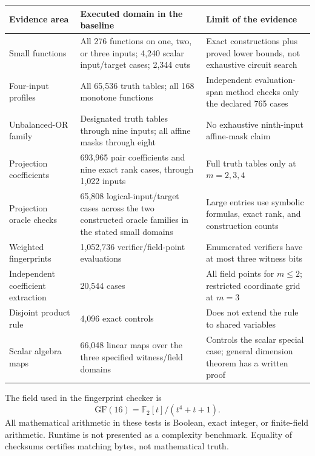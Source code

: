 \documentclass[11pt,letterpaper,oneside]{report}
\theoremstyle{komorebi}
\newcommand{\F}{\mathbb F_2}
\begin{document}
\small
\begin{longtable}{@{}p{1.57in}p{2.27in}p{2.00in}@{}}
\toprule
\textbf{Evidence area} & \textbf{Executed domain in the baseline} & \textbf{Limit of the evidence}\\\midrule\endhead
Small functions & All 276 functions on one, two, or three inputs; 4,240 scalar input/target cases; 2,344 cuts & Exact constructions plus proved lower bounds, not exhaustive circuit search\\
Four-input profiles & All 65,536 truth tables; all 168 monotone functions & Independent evaluation-span method checks only the declared 765 cases\\
Unbalanced-OR family & Designated truth tables through nine inputs; all affine masks through eight & No exhaustive ninth-input affine-mask claim\\
Projection coefficients & 693,965 pair coefficients and nine exact rank cases, through 1,022 inputs & Full truth tables only at $m=2,3,4$\\
Projection oracle checks & 65,808 logical-input/target cases across the two constructed oracle families in the stated small domains & Large entries use symbolic formulas, exact rank, and construction counts\\
Weighted fingerprints & 1,052,736 verifier/field-point evaluations & Enumerated verifiers have at most three witness bits\\
Independent coefficient extraction & 20,544 cases & All field points for $m\le2$; restricted coordinate grid at $m=3$\\
Disjoint product rule & 4,096 exact controls & Does not extend the rule to shared variables\\
Scalar algebra maps & 66,048 linear maps over the three specified witness/field domains & Controls the scalar special case; general dimension theorem has a written proof\\
\bottomrule
\end{longtable}
\normalsize

The field used in the fingerprint checker is
\[
 \mathrm{GF}(16)=\F[t]/(t^4+t+1).
\]
All mathematical arithmetic in these tests is Boolean, exact integer, or finite-field arithmetic. Runtime is not presented as a complexity benchmark. Equality of checksums certifies matching bytes, not mathematical truth.
\end{document}
